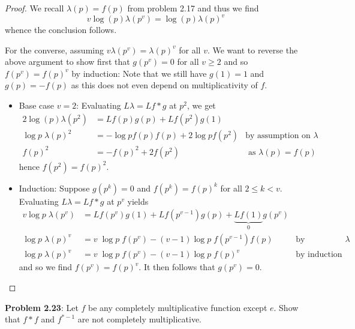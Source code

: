 \documentclass{article}
\begin{document}
\begin{proof}
We recall $\lambda(p) = f(p)$ from problem 2.17 and thus we find
$$v \log(p) \lambda(p^v) = \log(p) \lambda(p)^v$$
whence the conclusion follows.


For the converse, assuming $v \lambda(p^v) = \lambda(p)^v$ for all $v$. We want to reverse the above argument to show first that $g(p^v) = 0$ for all $v \geq 2$ and so $f(p^v) = f(p)^v$ by induction: Note that we still have $g(1) = 1$ and $g(p) = -f(p)$ as this does not even depend on multiplicativity of $f$.
\begin{itemize}
\item Base case $v = 2$: Evaluating $L\lambda = Lf * g$ at $p^2$, we get
\begin{align*}
2 \log(p) \lambda(p^2) &= Lf(p) g(p) + Lf(p^2) g(1)\\
\log p \; \lambda(p)^2 &= - \log p f(p) f(p) + 2 \log p f(p^2) &\text{by assumption on }\lambda\\
f(p)^2 &= - f(p)^2 + 2 f(p^2) &\text{ as }\lambda(p) = f(p)
\end{align*}
hence $f(p^2) = f(p)^2$.

\item Induction: Suppose $g(p^k) = 0$ and $f(p^k) = f(p)^k$ for all $2 \leq k  < v$. Evaluating $L\lambda = Lf * g$ at $p^v$ yields
\begin{align*}
v \log p \; \lambda(p^v) &= Lf(p^v) g(1) + Lf(p^{v-1}) g(p) + \underbrace{Lf(1)}_{0} g(p^v)\\
\log p \; \lambda(p)^v &= v \; \log p \; f(p^v) -  (v-1) \log p \; f(p^{v-1}) f(p) &\text{by assumption on }\lambda\\
\log p \; \lambda(p)^v &= v \; \log p \; f(p^v) - (v-1) \log p \; f(p)^v &\text{by induction hypothesis}
\end{align*}
and so we find $f(p^v) = f(p)^v$. It then follows that $g(p^v) = 0$.
\end{itemize}
\end{proof}

\textbf{Problem 2.23}: Let $f$ be any completely multiplicative function except $e$. Show that $f * f$ and $f^{*-1}$ are not completely multiplicative.
\end{document}

